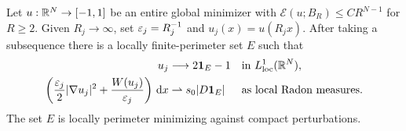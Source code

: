 \begin{proposition}
\label{prop:monotone-exact-limit}
Let $u:\mathbb R^N\to[-1,1]$ be an entire global minimizer with
$\mathcal E(u;B_R)\le CR^{N-1}$ for $R\ge2$.  Given
$R_j\to\infty$, set $\varepsilon_j=R_j^{-1}$ and $u_j(x)=u(R_jx)$.
After taking a subsequence there is a locally finite-perimeter set $E$
such that
\begin{equation}
 \begin{aligned}
 u_j&\longrightarrow 2\mathbf1_E-1
                    &&\text{in }L^1_{\mathrm{loc}}(\mathbb R^N),\\
 \left(\frac{\varepsilon_j}2|\nabla u_j|^2+
                \frac{W(u_j)}{\varepsilon_j}\right)\,\mathrm d x
   &\rightharpoonup s_0|D\mathbf1_E|
                    &&\text{as local Radon measures}.
 \end{aligned}
 \label{eq:monotone-exact-limit}
\end{equation}
The set $E$ is locally perimeter minimizing against compact perturbations.
\end{proposition}

